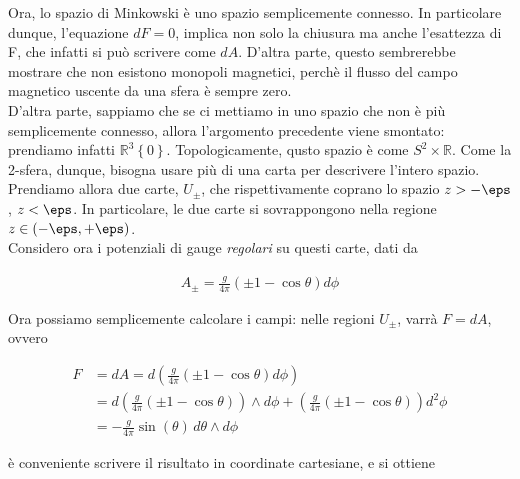 \documentclass{report}
\begin{document}
Ora, lo spazio di Minkowski è uno spazio semplicemente connesso. In particolare dunque, l'equazione \(dF =0\), implica non solo la chiusura ma anche l'esattezza di F, che infatti si può scrivere come \(dA\). D'altra parte, questo sembrerebbe mostrare che non esistono monopoli magnetici, perchè il flusso del campo magnetico uscente da una sfera è sempre zero. \\

D'altra parte, sappiamo che se ci mettiamo in uno spazio che non è più semplicemente connesso, allora l'argomento precedente viene smontato: prendiamo infatti \(\mathbb{R}^3 \left\{0\right\}\). Topologicamente, qusto spazio è come \(S^2 \times \mathbb{R}\). Come la 2-sfera, dunque, bisogna usare più di una carta per descrivere l'intero spazio. Prendiamo allora due carte, \(U_{\pm}\), che rispettivamente coprano lo spazio \(z > -\eps\), \(z < \eps\). In particolare, le due carte si sovrappongono nella regione \(z \in (-\eps, +\eps)\). \\

Considero ora i potenziali di gauge \emph{regolari} su questi carte, dati da 

\begin{align}
    A_{\pm} = \frac{g}{4\pi}(\pm 1 -\cos\theta)d\phi 
\end{align}


Ora possiamo semplicemente calcolare i campi: nelle regioni \(U_{\pm}\), varrà \(F = dA\), ovvero 

\begin{align}
    F &= dA = d\left(\frac{g}{4\pi}(\pm1 -\cos\theta) d\phi\right) \\
    &= d\left(\frac{g}{4\pi}(\pm1 -\cos\theta) \right) \wedge d\phi +  \left(\frac{g}{4\pi}(\pm1 -\cos\theta) \right)d^2\phi \\
    &= -\frac{g}{4\pi}\sin(\theta) \, d\theta \wedge d\phi 
\end{align}

è conveniente scrivere il risultato in coordinate cartesiane, e si ottiene 
\end{document}
